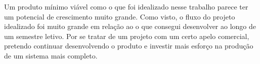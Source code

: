 \documentclass{abnt}
\begin{document}

Um produto mínimo viável como o que foi idealizado nesse trabalho parece ter um
potencial de crescimento muito grande. Como visto, o fluxo do projeto idealizado
foi muito grande em relação ao o que consegui desenvolver ao longo de um
semestre letivo. Por se tratar de um projeto com um certo apelo comercial,
pretendo continuar desenvolvendo o produto e investir mais esforço na produção
de um sistema mais completo.

\cite{drucker2008management}
\cite{dubey2007delivering}
\cite{laudon1995management}
\cite{mintzberg2006processo}
\cite{rezende2001tecnologia}
\cite{rezende2002tecnologia}
\cite{rezende2008planejamento}
\cite{sutherland2011scrum}
\cite{terence2002planejamento}
\cite{Turner2003}


\end{document}
